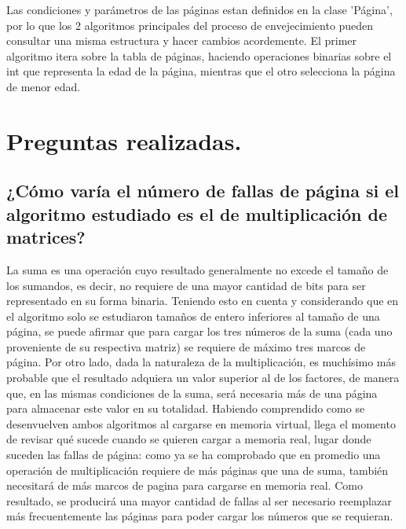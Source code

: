 \documentclass[a4paper]{article}
\begin{document}
Las condiciones y parámetros de las páginas estan definidos en la clase 'Página',
por lo que los 2 algoritmos principales del proceso de envejecimiento pueden
consultar una misma estructura y hacer cambios acordemente. El primer algoritmo
itera sobre la tabla de páginas, haciendo operaciones binarias sobre el int que
representa la edad de la página, mientras que el otro selecciona la página de
menor edad.

\section{Preguntas realizadas.}
\subsection{¿Cómo varía el número de fallas de página si el algoritmo 
estudiado es el de multiplicación de matrices?}


La suma es una operación cuyo resultado generalmente no excede el 
tamaño de los sumandos, es decir, no requiere de una mayor cantidad de 
bits para ser representado en su forma binaria. Teniendo esto en cuenta 
y considerando que en el algoritmo solo se estudiaron tamaños de entero inferiores al tamaño de una página, se puede afirmar que para cargar los tres números de la suma (cada uno proveniente de su respectiva matriz) se requiere de máximo tres marcos de página.  Por otro lado, dada la naturaleza de la multiplicación, 
es muchísimo más probable que el resultado adquiera un valor superior al de los factores, de manera que, en las mismas condiciones de la suma, será necesaria más de una página para almacenar este valor en su totalidad. 
Habiendo comprendido como se desenvuelven ambos algoritmos al cargarse en memoria virtual, llega el momento de revisar qué sucede cuando se quieren cargar a memoria real, lugar donde suceden las fallas de página: como ya se ha comprobado que en promedio una operación de multiplicación requiere de más páginas que una de suma, también necesitará de más marcos de pagina para cargarse en memoria real. Como resultado, se producirá una mayor cantidad de fallas al ser necesario reemplazar más frecuentemente las páginas para poder cargar los números que se requieran.
\end{document}
